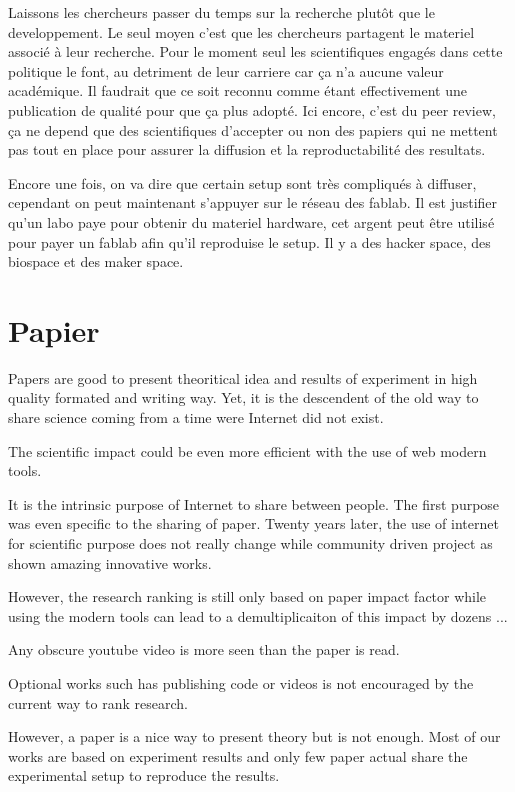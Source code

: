 Laissons les chercheurs passer du temps sur la recherche plutôt que le developpement. Le seul moyen c'est que les chercheurs partagent le materiel associé à leur recherche. Pour le moment seul les scientifiques engagés dans cette politique le font, au detriment de leur carriere car ça n'a aucune valeur académique. Il faudrait que ce soit reconnu comme étant effectivement une publication de qualité pour que ça plus adopté.
Ici encore, c'est du peer review, ça ne depend que des scientifiques d'accepter ou non des papiers qui ne mettent pas tout en place pour assurer la diffusion et la reproductabilité des resultats.


Encore une fois, on va dire que certain setup sont très compliqués à diffuser, cependant on peut maintenant s'appuyer sur le réseau des fablab. Il est justifier qu'un labo paye pour obtenir du materiel hardware, cet argent peut être utilisé pour payer un fablab afin qu'il reproduise le setup. Il y a des hacker space, des biospace et des maker space.



\section{Papier} %
\label{sec:papier}
Papers are good to present theoritical idea and results of experiment in high quality formated and writing way.
Yet, it is the descendent of the old way to share science coming from a time were Internet did not exist.

The scientific impact could be even more efficient with the use of web modern tools.

It is the intrinsic purpose of Internet to share between people.
The first purpose was even specific to the sharing of paper.
Twenty years later, the use of internet for scientific purpose does not really change while community driven project as shown amazing innovative works.

However, the research ranking is still only based on paper impact factor while using the modern tools can lead to a demultiplicaiton of this impact by dozens ...

Any obscure youtube video is more seen than the paper is read.

Optional works such has publishing code or videos is not encouraged by the current way to rank research.

However, a paper is a nice way to present theory but is not enough.
Most of our works are based on experiment results and only few paper actual share the experimental setup to reproduce the results.

